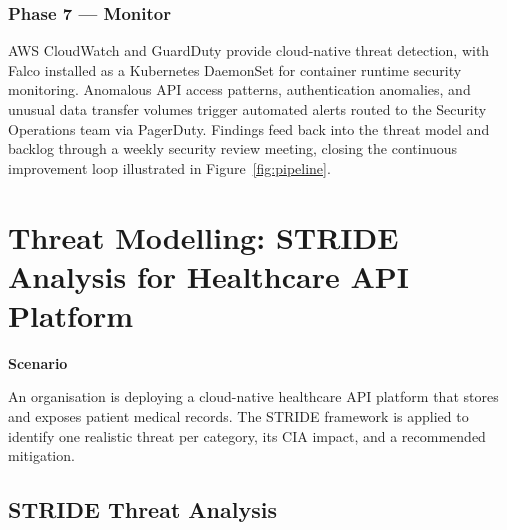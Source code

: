 \documentclass[12pt,a4paper]{article}
\newenvironment{secbox}[1]{%
  \begin{framed}
  \noindent\textbf{\color{phaseblue}#1}\par\medskip
}{%
  \end{framed}
}
\begin{document}
\subsubsection*{Phase 7 — Monitor}

AWS CloudWatch and GuardDuty provide cloud-native threat detection, with Falco installed as
a Kubernetes DaemonSet for container runtime security monitoring. Anomalous API access
patterns, authentication anomalies, and unusual data transfer volumes trigger automated
alerts routed to the Security Operations team via PagerDuty. Findings feed back into the
threat model and backlog through a weekly security review meeting, closing the continuous
improvement loop illustrated in Figure~\ref{fig:pipeline}.

\newpage

\section{Threat Modelling: STRIDE Analysis for Healthcare API Platform}

\begin{secbox}{Scenario}
An organisation is deploying a cloud-native healthcare API platform that stores and exposes
patient medical records. The STRIDE framework is applied to identify one realistic threat
per category, its CIA impact, and a recommended mitigation.
\end{secbox}

\subsection{STRIDE Threat Analysis}
\end{document}
